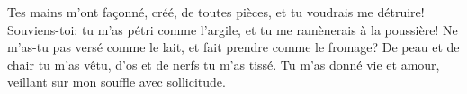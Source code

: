 Tes mains m’ont façonné, créé, de toutes pièces,
	et tu voudrais me détruire!
Souviens-toi: tu m’as pétri comme l’argile, et tu me ramènerais à la poussière!
Ne m’as-tu pas versé comme le lait,
		et fait prendre comme le fromage?
De peau et de chair tu m’as vêtu, d’os et de nerfs tu m’as tissé.
Tu m’as donné vie et amour,
	veillant sur mon souffle avec sollicitude.
